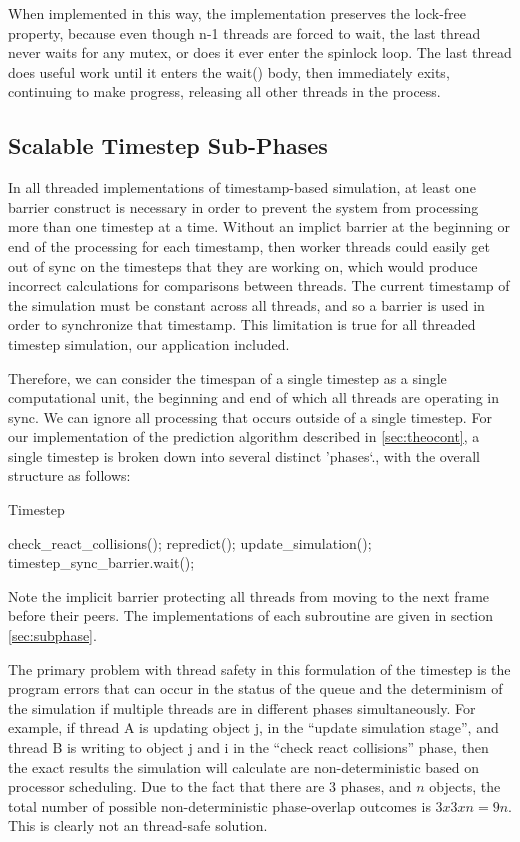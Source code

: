 \documentclass[conference]{IEEEtran}
\begin{document}
When implemented in this way, the implementation preserves the lock-free property, because even though n-1 threads are forced to wait, the last thread never waits for any 
mutex, or does it ever enter the spinlock loop.  The last thread does useful work until it enters the wait() body, then immediately exits, continuing to make progress, releasing all
other threads in the process.

\subsection{Scalable Timestep Sub-Phases}
\label{sec:stsp}
In all threaded implementations of timestamp-based simulation, at least one barrier construct
is necessary in order to prevent the system from processing more than one timestep at a time.  Without an implict barrier at the beginning or end of the 
processing for each timestamp, then worker threads could easily get out of sync on the timesteps that they are working on, which would produce incorrect calculations
for comparisons between threads.  The current timestamp of the simulation must be constant across all threads, and so a barrier is used in order to synchronize that timestamp.  This
limitation is true for all threaded timestep simulation, our application included.

Therefore, we can consider the timespan of a single timestep as a single computational unit, the beginning and end of which all threads are operating in sync.  We can ignore
all processing that occurs outside of a single timestep.  For our implementation of the prediction algorithm described in \ref{sec:theocont}, a single timestep is broken down
into several distinct 'phases`., with the overall structure as follows:

\begin{algorithm}
\caption{Timestep}
\begin{algorithmic}
\STATE check\_react\_collisions();
\STATE repredict();
\STATE update\_simulation();
\STATE timestep\_sync\_barrier.wait();
\end{algorithmic}
\end{algorithm}

Note the implicit barrier protecting all threads from moving to the next frame before their peers.  The implementations of each subroutine are given in section \ref{sec:subphase}.

The primary problem with thread safety in this formulation of the timestep is the program errors that can occur in the status of the queue and the determinism of the simulation
if multiple threads are in different phases simultaneously.  For example, if thread A is updating object j, in the ``update simulation stage'', and thread B is writing to object 
j and i in the ``check react collisions'' phase, then the exact results the simulation will calculate are non-deterministic based on processor scheduling.  
Due to the fact that there are 3 phases, and $n$ objects, the total number of possible non-deterministic phase-overlap outcomes is $3x3xn=9n$.  This is clearly not an thread-safe solution.
\end{document}

